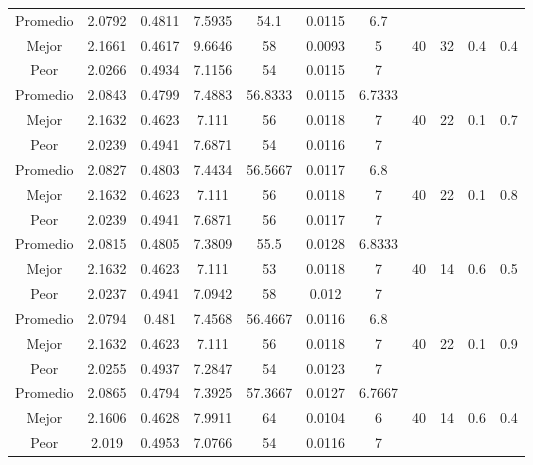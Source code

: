 \begin{table}[h!]
\begin{center}
\begin{tabular}{|c|c|c|c|c|c|c|c|c|c|c|}
        \hline
        \hline
            Promedio  & 2.0792 & 0.4811 & 7.5935 & 54.1 & 0.0115 & 6.7 &  &  &  & \\
            \cline{1-7}
            Mejor & 2.1661 & 0.4617  & 9.6646 & 58 & 0.0093 & 5 & 40 & 32 & 0.4 & 0.4\\
            \cline{1-7}
            Peor & 2.0266 & 0.4934  & 7.1156 & 54 & 0.0115 & 7 &  &  &  & \\
        \hline
        \hline
            Promedio  & 2.0843 & 0.4799 & 7.4883 & 56.8333 & 0.0115 & 6.7333 &  &  &  & \\
            \cline{1-7}
            Mejor & 2.1632 & 0.4623  & 7.111 & 56 & 0.0118 & 7 & 40 & 22 & 0.1 & 0.7\\
            \cline{1-7}
            Peor & 2.0239 & 0.4941  & 7.6871 & 54 & 0.0116 & 7 &  &  &  & \\
        \hline
        \hline
            Promedio  & 2.0827 & 0.4803 & 7.4434 & 56.5667 & 0.0117 & 6.8 &  &  &  & \\
            \cline{1-7}
            Mejor & 2.1632 & 0.4623  & 7.111 & 56 & 0.0118 & 7 & 40 & 22 & 0.1 & 0.8\\
            \cline{1-7}
            Peor & 2.0239 & 0.4941  & 7.6871 & 56 & 0.0117 & 7 &  &  &  & \\
        \hline
        \hline
            Promedio  & 2.0815 & 0.4805 & 7.3809 & 55.5 & 0.0128 & 6.8333 &  &  &  & \\
            \cline{1-7}
            Mejor & 2.1632 & 0.4623  & 7.111 & 53 & 0.0118 & 7 & 40 & 14 & 0.6 & 0.5\\
            \cline{1-7}
            Peor & 2.0237 & 0.4941  & 7.0942 & 58 & 0.012 & 7 &  &  &  & \\
        \hline
        \hline
            Promedio  & 2.0794 & 0.481 & 7.4568 & 56.4667 & 0.0116 & 6.8 &  &  &  & \\
            \cline{1-7}
            Mejor & 2.1632 & 0.4623  & 7.111 & 56 & 0.0118 & 7 & 40 & 22 & 0.1 & 0.9\\
            \cline{1-7}
            Peor & 2.0255 & 0.4937  & 7.2847 & 54 & 0.0123 & 7 &  &  &  & \\
        \hline
        \hline
            Promedio  & 2.0865 & 0.4794 & 7.3925 & 57.3667 & 0.0127 & 6.7667 &  &  &  & \\
            \cline{1-7}
            Mejor & 2.1606 & 0.4628  & 7.9911 & 64 & 0.0104 & 6 & 40 & 14 & 0.6 & 0.4\\
            \cline{1-7}
            Peor & 2.019 & 0.4953  & 7.0766 & 54 & 0.0116 & 7 &  &  &  & \\

\end{tabular}
\end{center}
\end{table}
